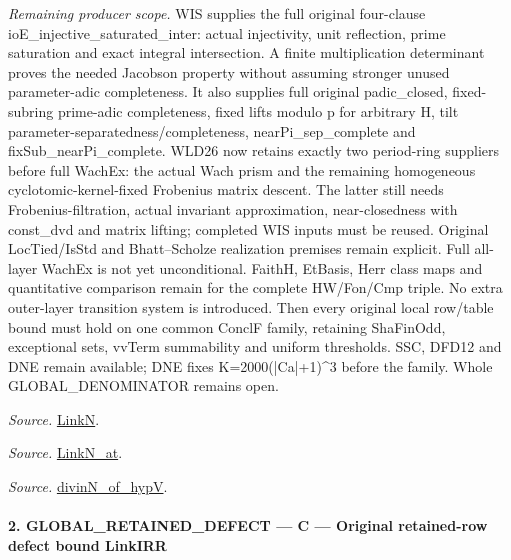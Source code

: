 \emph{Remaining producer scope.} WIS supplies the full original four-clause ioE\_\allowbreak injective\_\allowbreak saturated\_\allowbreak inter: actual injectivity, unit reflection, prime saturation and exact integral intersection. A finite multiplication determinant proves the needed Jacobson property without assuming stronger unused parameter-adic completeness. It also supplies full original padic\_\allowbreak closed, fixed-subring prime-adic completeness, fixed lifts modulo p for arbitrary H, tilt parameter-separatedness/completeness, nearPi\_\allowbreak sep\_\allowbreak complete and fixSub\_\allowbreak nearPi\_\allowbreak complete. WLD26 now retains exactly two period-ring suppliers before full WachEx: the actual Wach prism and the remaining homogeneous cyclotomic-kernel-fixed Frobenius matrix descent. The latter still needs Frobenius-filtration, actual invariant approximation, near-closedness with const\_\allowbreak dvd and matrix lifting; completed WIS inputs must be reused. Original LocTied/IsStd and Bhatt–Scholze realization premises remain explicit. Full all-layer WachEx is not yet unconditional. FaithH, EtBasis, Herr class maps and quantitative comparison remain for the complete HW/Fon/Cmp triple. No extra outer-layer transition system is introduced. Then every original local row/table bound must hold on one common ConclF family, retaining ShaFinOdd, exceptional sets, vvTerm summability and uniform thresholds. SSC, DFD12 and DNE remain available; DNE fixes K=2000(|Ca|+1)\textasciicircum{}3 before the family. Whole GLOBAL\_\allowbreak DENOMINATOR remains open.

\emph{Source.} \href{https://github.com/CocoSgt/riemann-hypothesis-lean/blob/7cbf7a0c32fca1badf05931879a37c3f8a2b03b4/src/Formalism/SharpRestriction/GlobalTheoremInputs.lean#L45-L48}{LinkN}.

\emph{Source.} \href{https://github.com/CocoSgt/riemann-hypothesis-lean/blob/7cbf7a0c32fca1badf05931879a37c3f8a2b03b4/src/Formalism/SharpRestriction/GlobalTheoremInputs.lean#L40-L44}{LinkN\_\allowbreak at}.

\emph{Source.} \href{https://github.com/CocoSgt/riemann-hypothesis-lean/blob/7cbf7a0c32fca1badf05931879a37c3f8a2b03b4/src/Development/AutomorphicArithmetic/CharacterBoxes/DivinNOfHypV.lean#L117-L134}{divinN\_\allowbreak of\_\allowbreak hypV}.



\paragraph{2. GLOBAL\_\allowbreak RETAINED\_\allowbreak DEFECT — C — Original retained-row defect bound LinkIRR}

